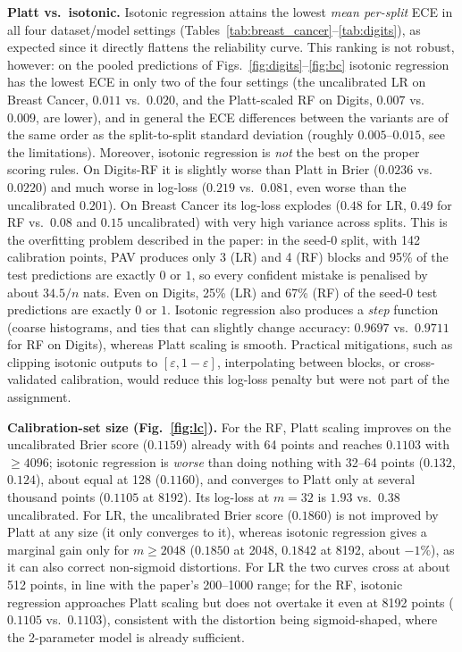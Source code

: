 \documentclass[11pt,a4paper]{article}
\begin{document}
\textbf{Platt vs.\ isotonic.} Isotonic regression attains the lowest \emph{mean per-split} ECE in all four dataset/model settings (Tables~\ref{tab:breast_cancer}--\ref{tab:digits}), as expected since it directly flattens the reliability curve. This ranking is not robust, however: on the pooled predictions of Figs.~\ref{fig:digits}--\ref{fig:bc} isotonic regression has the lowest ECE in only two of the four settings (the uncalibrated LR on Breast Cancer, $0.011$ vs.\ $0.020$, and the Platt-scaled RF on Digits, $0.007$ vs.\ $0.009$, are lower), and in general the ECE differences between the variants are of the same order as the split-to-split standard deviation (roughly $0.005$--$0.015$, see the limitations). Moreover, isotonic regression is \emph{not} the best on the proper scoring rules. On Digits-RF it is slightly worse than Platt in Brier ($0.0236$ vs.\ $0.0220$) and much worse in log-loss ($0.219$ vs.\ $0.081$, even worse than the uncalibrated $0.201$). On Breast Cancer its log-loss explodes ($0.48$ for LR, $0.49$ for RF vs.\ $0.08$ and $0.15$ uncalibrated) with very high variance across splits. This is the overfitting problem described in the paper: in the seed-0 split, with 142 calibration points, PAV produces only 3 (LR) and 4 (RF) blocks and 95\% of the test predictions are exactly $0$ or $1$, so every confident mistake is penalised by about $34.5/n$ nats. Even on Digits, 25\% (LR) and 67\% (RF) of the seed-0 test predictions are exactly $0$ or $1$. Isotonic regression also produces a \emph{step} function (coarse histograms, and ties that can slightly change accuracy: $0.9697$ vs.\ $0.9711$ for RF on Digits), whereas Platt scaling is smooth. Practical mitigations, such as clipping isotonic outputs to $[\varepsilon,1-\varepsilon]$, interpolating between blocks, or cross-validated calibration, would reduce this log-loss penalty but were not part of the assignment.

\textbf{Calibration-set size (Fig.~\ref{fig:lc}).} For the RF, Platt scaling improves on the uncalibrated Brier score ($0.1159$) already with 64 points and reaches $0.1103$ with $\ge4096$; isotonic regression is \emph{worse} than doing nothing with 32--64 points ($0.132$, $0.124$), about equal at 128 ($0.1160$), and converges to Platt only at several thousand points ($0.1105$ at 8192). Its log-loss at $m=32$ is $1.93$ vs.\ $0.38$ uncalibrated. For LR, the uncalibrated Brier score ($0.1860$) is not improved by Platt at any size (it only converges to it), whereas isotonic regression gives a marginal gain only for $m\ge2048$ ($0.1850$ at 2048, $0.1842$ at 8192, about $-1\%$), as it can also correct non-sigmoid distortions. For LR the two curves cross at about 512 points, in line with the paper's 200--1000 range; for the RF, isotonic regression approaches Platt scaling but does not overtake it even at 8192 points ($0.1105$ vs.\ $0.1103$), consistent with the distortion being sigmoid-shaped, where the 2-parameter model is already sufficient.
\end{document}
